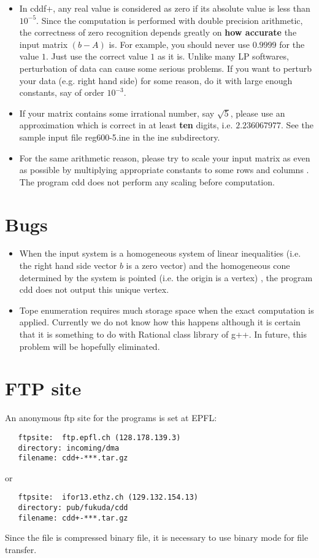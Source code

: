 \begin{itemize}

\item  In cddf+, any real value is considered as zero if its absolute value is
less than $10^{-5}$.  Since the computation is performed with double precision
arithmetic, the correctness of zero recognition depends greatly on {\bf how
accurate\/} the input matrix $(b- A)$ is.  For example, you should never use
$0.9999$ for the value $1$.  Just use the correct value $1$ as it is.
Unlike many LP softwares, perturbation of data
can cause some serious problems.  If you want to perturb your data (e.g. right
hand side) for some reason, do it with large enough constants, say of order
$10^{-3}$.


\item If your matrix contains some irrational number, say
$\sqrt{5}$, please use an approximation which is correct in at least {\bf ten\/} digits,
i.e.  $2.236067977$.   See the sample input file  reg600-5.ine in the ine subdirectory.
 
\item  For the same arithmetic reason, please try to scale your input matrix
as even as possible by multiplying appropriate constants to some rows and
columns .   The program cdd does not perform any scaling before
computation.

\end{itemize}

\section{Bugs}  \label{BUGS}
\begin{itemize}

\item When the input system is a homogeneous system of linear inequalities
(i.e. the right hand side vector $b$ is a zero vector) and the homogeneous
cone determined by the system is pointed (i.e. the origin is a vertex) , 
the program cdd does not output this unique vertex.

\item Tope enumeration requires much storage space when the exact
computation is applied.  Currently we do not know how this happens
although it is certain that it is something to do with Rational class
library of g++. In future, this problem will be hopefully eliminated.

\end{itemize}

\section{FTP site}  \label{FTP}
An anonymous ftp site for the programs is set at EPFL:
\begin{verbatim}
   ftpsite:  ftp.epfl.ch (128.178.139.3)
   directory: incoming/dma
   filename: cdd+-***.tar.gz
\end{verbatim}
or
\begin{verbatim}
   ftpsite:  ifor13.ethz.ch (129.132.154.13)
   directory: pub/fukuda/cdd
   filename: cdd+-***.tar.gz
\end{verbatim}
Since the file is compressed binary file, it is necessary to use binary mode for
file transfer.

